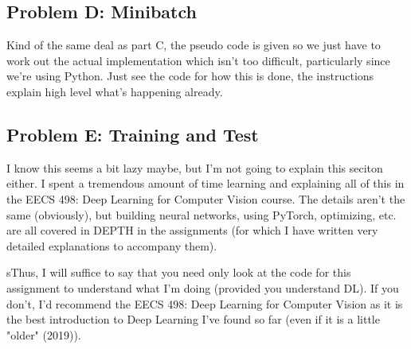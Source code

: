 \documentclass[12pt]{article}
\begin{document}
\subsection{Problem D: Minibatch}
Kind of the same deal as part C, the pseudo code is given so we just have to work out 
the actual implementation which isn't too difficult, particularly since 
we're using Python. Just see the code for how this is done, the instructions 
explain high level what's happening already. 

\subsection{Problem E: Training and Test}
I know this seems a bit lazy maybe, but I'm not going to explain this seciton either. 
I spent a tremendous amount of time learning and explaining all of this 
in the EECS 498: Deep Learning for Computer Vision course. The details aren't the 
same (obviously), but building neural networks, using PyTorch, optimizing, etc. 
are all covered in DEPTH in the assignments (for which I have written very detailed 
explanations to accompany them). 

sThus, I will suffice to say that you need only look 
at the code for this assignment to understand what I'm doing (provided you understand 
DL). If you don't, I'd recommend the EECS 498: Deep Learning for Computer Vision as it 
is the best introduction to Deep Learning I've found so far (even if it is a little 
"older" (2019)). 

\subsection{}
\end{document}
